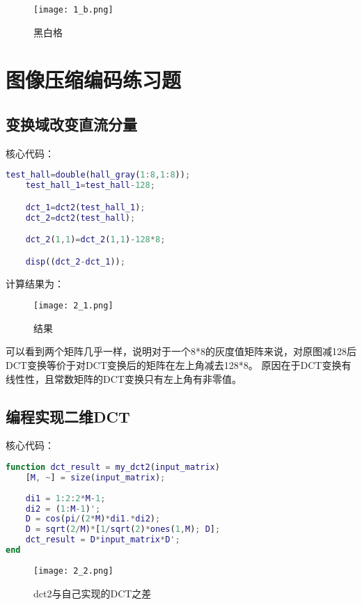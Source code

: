 \documentclass[12pt]{article}
\begin{document}
\begin{figure}[H]
    \centering
    \texttt{[image: 1\_b.png]}
    \caption{黑白格}
\end{figure}

\section{图像压缩编码练习题}

\subsection{变换域改变直流分量}

核心代码：
\begin{lstlisting}[language=matlab]
    test_hall=double(hall_gray(1:8,1:8));
    test_hall_1=test_hall-128;

    dct_1=dct2(test_hall_1);
    dct_2=dct2(test_hall);

    dct_2(1,1)=dct_2(1,1)-128*8;

    disp((dct_2-dct_1));
\end{lstlisting}

计算结果为：
\begin{figure}[H]
    \centering
    \texttt{[image: 2\_1.png]}
    \caption{结果}
\end{figure}

可以看到两个矩阵几乎一样，说明对于一个8*8的灰度值矩阵来说，对原图减128后DCT变换等价于对DCT变换后的矩阵在左上角减去128*8。
原因在于DCT变换有线性性，且常数矩阵的DCT变换只有左上角有非零值。

\subsection{编程实现二维DCT}

核心代码：
\begin{lstlisting}[language = matlab]
    function dct_result = my_dct2(input_matrix)
    [M, ~] = size(input_matrix);
    
    di1 = 1:2:2*M-1;
    di2 = (1:M-1)';
    D = cos(pi/(2*M)*di1.*di2);
    D = sqrt(2/M)*[1/sqrt(2)*ones(1,M); D];
    dct_result = D*input_matrix*D';
end
\end{lstlisting}

\begin{figure}[H]
    \centering
    \texttt{[image: 2\_2.png]}
    \caption{dct2与自己实现的DCT之差}
\end{figure}
\end{document}
